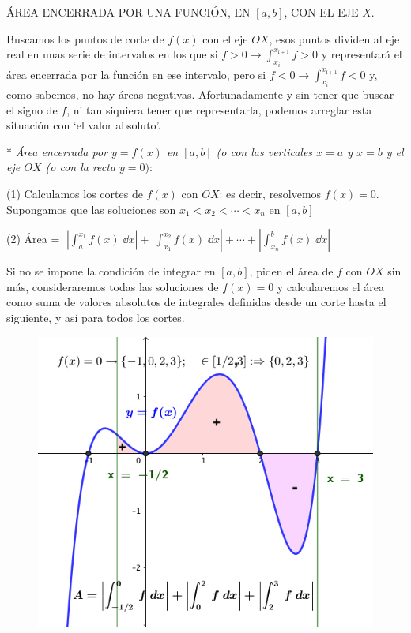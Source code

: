 ÁREA ENCERRADA POR UNA FUNCIÓN, EN $[a,b]$, CON EL EJE $X$.	

Buscamos los puntos de corte de $f(x)$ con el eje $OX$, esos puntos dividen al eje real en unas serie de intervalos en los que si 
$f>0\to \int_{x_i}^{x_{î+1}} f >0$ 
y representará el área encerrada por la función en ese intervalo, pero si  
$f<0 \to \int_{x_i}^{x_{î+1}} f <0$
y, como sabemos, no hay áreas negativas. Afortunadamente y sin tener que buscar el signo de $f$, ni tan siquiera tener que representarla, podemos arreglar esta situación con `el valor absoluto'.

* \emph{Área encerrada por $y=f(x)$ en $[a,b]$ (o con las verticales $x=a$ y $x=b$ y el eje $OX$ (o con la recta $y=0)$}:

\hspace{5mm} (1) Calculamos los cortes de $f(x)$ con $OX$: es decir, resolvemos $f(x)=0$.  Supongamos que las soluciones son $x_1<x_2< \cdots <x_n$ en $[a,b]$

\hspace{5mm} (2) Área = $\; \displaystyle \left| \int_a^{x_1} f(x)\; \dd x \right| + \left| \int_{x_1}^{x_2} f(x)\; \dd x \right| + \cdots + \left| \int_{x_n}^b f(x)\; \dd x \right| $

Si no se impone la condición de integrar en $[a,b]$, piden el área de $f$ con $OX$ sin más, consideraremos todas las soluciones de $f(x)=0$ y calcularemos el área como suma de valores absolutos de integrales definidas desde un corte hasta el siguiente, y así para todos los cortes.

	\begin{figure}[H]
 		\centering
		\includegraphics[width=.75\textwidth]{imagenes/imagenes08/T08IM12.png}
	\end{figure}


